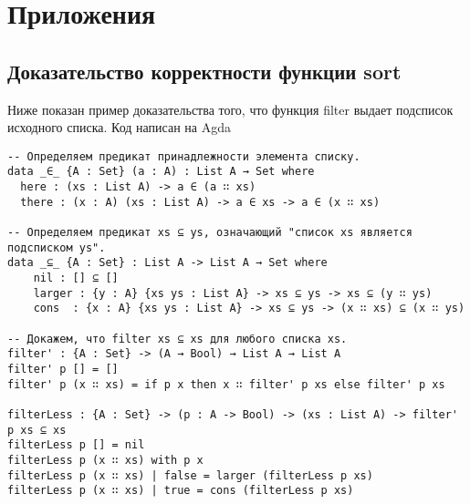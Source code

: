 \appendix
\section*{Приложения}
\renewcommand{\thesubsection}{\Alph{subsection}}

\subsection{Доказательство корректности функции sort}\label{sort_proof}

Ниже показан пример доказательства того, что функция filter выдает подсписок исходного списка.
Код написан на Agda\cite{agda}

\begin{lstlisting}
-- Определяем предикат принадлежности элемента списку.
data _∈_ {A : Set} (a : A) : List A → Set where
  here : (xs : List A) -> a ∈ (a ∷ xs)
  there : (x : A) (xs : List A) -> a ∈ xs -> a ∈ (x ∷ xs)

-- Определяем предикат xs ⊆ ys, означающий "список xs является подсписком ys".
data _⊆_ {A : Set} : List A -> List A → Set where
    nil : [] ⊆ []
    larger : {y : A} {xs ys : List A} -> xs ⊆ ys -> xs ⊆ (y ∷ ys)
    cons  : {x : A} {xs ys : List A} -> xs ⊆ ys -> (x ∷ xs) ⊆ (x ∷ ys)

-- Докажем, что filter xs ⊆ xs для любого списка xs.
filter' : {A : Set} -> (A → Bool) → List A → List A
filter' p [] = []
filter' p (x ∷ xs) = if p x then x ∷ filter' p xs else filter' p xs

filterLess : {A : Set} -> (p : A -> Bool) -> (xs : List A) -> filter' p xs ⊆ xs
filterLess p [] = nil
filterLess p (x ∷ xs) with p x
filterLess p (x ∷ xs) | false = larger (filterLess p xs)
filterLess p (x ∷ xs) | true = cons (filterLess p xs)

\end{lstlisting}

